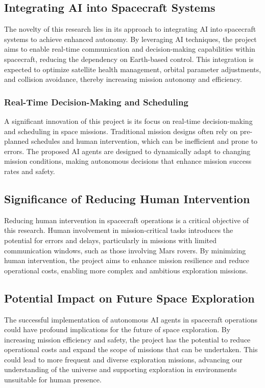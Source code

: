 \documentclass[a4paper, 11pt]{article}
\begin{document}
\subsection{Integrating AI into Spacecraft Systems}

The novelty of this research lies in its approach to integrating AI into spacecraft systems to achieve enhanced autonomy. By leveraging AI techniques, the project aims to enable real-time communication and decision-making capabilities within spacecraft, reducing the dependency on Earth-based control. This integration is expected to optimize satellite health management, orbital parameter adjustments, and collision avoidance, thereby increasing mission autonomy and efficiency.

\subsubsection{Real-Time Decision-Making and Scheduling}

A significant innovation of this project is its focus on real-time decision-making and scheduling in space missions. Traditional mission designs often rely on pre-planned schedules and human intervention, which can be inefficient and prone to errors. The proposed AI agents are designed to dynamically adapt to changing mission conditions, making autonomous decisions that enhance mission success rates and safety.

\subsection{Significance of Reducing Human Intervention}

Reducing human intervention in spacecraft operations is a critical objective of this research. Human involvement in mission-critical tasks introduces the potential for errors and delays, particularly in missions with limited communication windows, such as those involving Mars rovers. By minimizing human intervention, the project aims to enhance mission resilience and reduce operational costs, enabling more complex and ambitious exploration missions.

\subsection{Potential Impact on Future Space Exploration}

The successful implementation of autonomous AI agents in spacecraft operations could have profound implications for the future of space exploration. By increasing mission efficiency and safety, the project has the potential to reduce operational costs and expand the scope of missions that can be undertaken. This could lead to more frequent and diverse exploration missions, advancing our understanding of the universe and supporting exploration in environments unsuitable for human presence.
\end{document}
